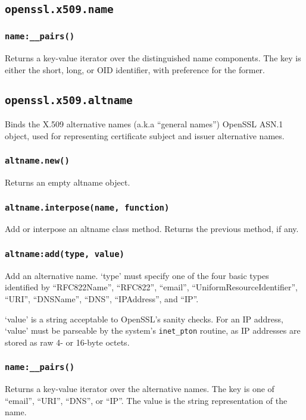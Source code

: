 \documentclass[11pt, oneside]{memoir}
\newcommand*{\fn}[1]{\texttt{#1}\xspace}
\newcounter{toccols}
\newenvironment{Module}[1]{
	\subsection{\texttt{#1}}
	\addtocontents{toc}{
		\protect\begin{multicols}{\value{toccols}}
	}
}{
	\addtocontents{toc}{\protect\end{multicols}}
}
\begin{document}
\begin{Module}{openssl.x509.name}
\subsubsection[\fn{name:\_\_pairs}]{\fn{name:\_\_pairs()}}

Returns a key-value iterator over the distinguished name components. The key is either the short, long, or OID identifier, with preference for the former.

\end{Module}


\begin{Module}{openssl.x509.altname}

Binds the X.509 alternative names (a.k.a ``general names'') OpenSSL ASN.1 object, used for representing certificate subject and issuer alternative names.

\subsubsection[\fn{altname.new}]{\fn{altname.new()}}

Returns an empty altname object.

\subsubsection[\fn{altname.interpose}]{\fn{altname.interpose(name, function)}}

Add or interpose an altname class method. Returns the previous method, if any.

\subsubsection[\fn{altname:add}]{\fn{altname:add(type, value)}}

Add an alternative name. `type' must specify one of the four basic types identified by ``RFC822Name'', ``RFC822'', ``email'', ``UniformResourceIdentifier'', ``URI'', ``DNSName'', ``DNS'', ``IPAddress'', and ``IP''.

`value' is a string acceptable to OpenSSL's sanity checks. For an IP address, `value' must be parseable by the system's \fn{inet\_pton} routine, as IP addresses are stored as raw 4- or 16-byte octets.

\subsubsection[\fn{name:\_\_pairs}]{\fn{name:\_\_pairs()}}

Returns a key-value iterator over the alternative names. The key is one of ``email'', ``URI'', ``DNS'', or ``IP''. The value is the string representation of the name.

\end{Module}
\end{document}
